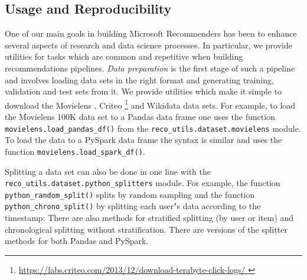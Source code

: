 \subsection{Usage and Reproducibility} %

One of our main goals in building Microsoft Recommenders has been to enhance several aspects of research and data science processes.
In particular, we provide utilities for tasks which are common and repetitive when building recommendations pipelines.  
{\em Data preparation} is the first stage of such a pipeline and involves loading data sets in the right format and generating training, validation and test sets from it.
We provide utilities which make it simple to download the Movielens \cite{movielens}, Criteo \footnote{\url{https://labs.criteo.com/2013/12/download-terabyte-click-logs/
}} and Wikidata \cite{wikidata} data sets. 
For example, to load 
the Movielens 100K data set to a Pandas data frame
one uses the function \verb!movielens.load_pandas_df()! from the \verb!reco_utils.dataset.movielens! module.
To load the data to a PySpark data frame the syntax is similar and uses the function \verb!movielens.load_spark_df()!.

Splitting a data set can also be done in one line 
with the \verb!reco_utils.dataset.python_splitters! module.
For example, the function 
\verb!python_random_split()! splits by random sampling 
and the function \verb!python_chrono_split()! by splitting each user"s data according to the timestamp: 
There are also methods for stratified splitting (by user or item) and chronological splitting without stratification. 
There are versions of the splitter methods for both Pandas and PySpark.

